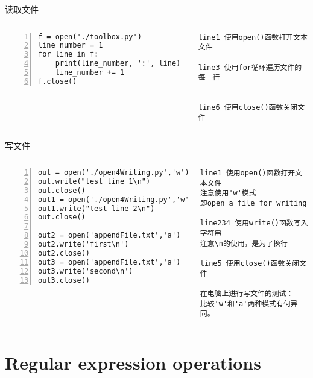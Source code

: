 \documentclass{beamer}
\begin{document}
\begin{frame}[fragile]{读取文件}

\begin{columns}
\begin{Verbatim}[numbers=left,frame=single,rulecolor=\color{red}]
f = open('./toolbox.py')
line_number = 1
for line in f:
    print(line_number, ':', line)
    line_number += 1
f.close()
\end{Verbatim}
\tiny{
\begin{Verbatim}[numbers=none,frame=none,rulecolor=\color{red}]
line1 使用open()函数打开文本文件

line3 使用for循环遍历文件的每一行

  
line6 使用close()函数关闭文件
\end{Verbatim}
}
\end{columns}
\end{frame}

\begin{frame}[fragile]{写文件}

\begin{columns}
\begin{Verbatim}[numbers=left,frame=single,rulecolor=\color{red}]
out = open('./open4Writing.py','w')
out.write("test line 1\n")
out.close()
out1 = open('./open4Writing.py','w')
out1.write("test line 2\n")
out.close()

out2 = open('appendFile.txt','a')
out2.write('first\n')
out2.close()
out3 = open('appendFile.txt','a')
out3.write('second\n')
out3.close()
\end{Verbatim}
\tiny{
\begin{Verbatim}[numbers=none,frame=none,rulecolor=\color{red}]
line1 使用open()函数打开文本文件
注意使用'w'模式
即open a file for writing

line234 使用write()函数写入字符串
注意\n的使用，是为了换行
  
line5 使用close()函数关闭文件

在电脑上进行写文件的测试：
比较'w'和'a'两种模式有何异同。
\end{Verbatim}
}
\end{columns}
\end{frame}
\section{Regular expression operations}
\end{document}
